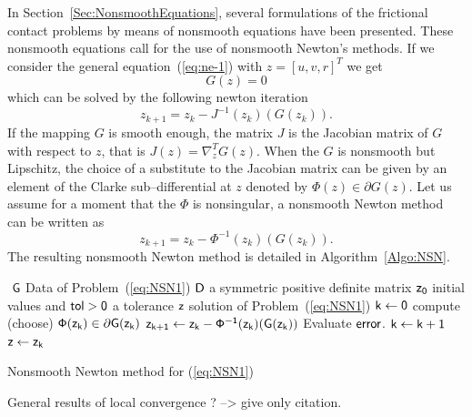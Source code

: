 In Section~\ref{Sec:NonsmoothEquations}, several formulations of the frictional contact problems by means of nonsmooth equations  have been presented. These nonsmooth equations call for the use of nonsmooth Newton's methods. If we consider the general equation~(\ref{eq:ne-1}) with $z = [u,v,r]^T$ we get
\begin{equation}
  \label{eq:NSN1}
  G(z)=0
\end{equation}
which can be solved by the following newton iteration
\begin{equation}
  \label{eq:NSN2}
  z_{k+1}  =  z_k -  J^{-1}(z_k) (G(z_k)).
\end{equation}
If the mapping $G$ is smooth enough, the matrix $J$ is the Jacobian matrix of $G$ with respect to $z$, that is $J(z) = \nabla^T_z G(z)$. When the $G$ is nonsmooth but Lipschitz,  the choice of a substitute to the Jacobian matrix can be given by an element of the Clarke sub--differential at $z$ denoted by $ \Phi(z) \in \partial G(z)$. Let us assume for a moment that the $\Phi$ is nonsingular, a nonsmooth Newton method can be written as 
\begin{equation}
  \label{eq:NSN3}
  z_{k+1}  =  z_k -  \Phi^{-1}(z_k) (G(z_k)).
\end{equation}
The resulting nonsmooth Newton method is detailed in Algorithm~\ref{Algo:NSN}.
\begin{algorithm}
  \begin{algorithmic}
    {\sf
      \STATE $ $
      \REQUIRE $\sf G $ Data of Problem~(\ref{eq:NSN1})
      \REQUIRE $\sf D$ a symmetric positive definite matrix
      \REQUIRE $\sf z_0$ initial values and $\sf tol >0$ a tolerance
      \ENSURE  $\sf z$ solution of Problem~(\ref{eq:NSN1})
      \STATE   $\sf k \leftarrow 0$ 
      \STATE compute (choose) $\sf \Phi(z_k) \in \partial G(z_k)$
      \STATE $\sf z_{k+1} \leftarrow   z_k -  \Phi^{-1}(z_k) (G(z_k))$
      \STATE Evaluate $\sf error$.
      \STATE $\sf k \leftarrow k+1$
      \ENDWHILE
      \STATE $\sf z \leftarrow z_{k}$ 
    }
  \end{algorithmic}
  \caption{Nonsmooth Newton method for (\ref{eq:NSN1})}  \label{Algo:NSN}
\end{algorithm}

\begin{ndrva}
  General results of local convergence ? --> give only citation.
\end{ndrva}


